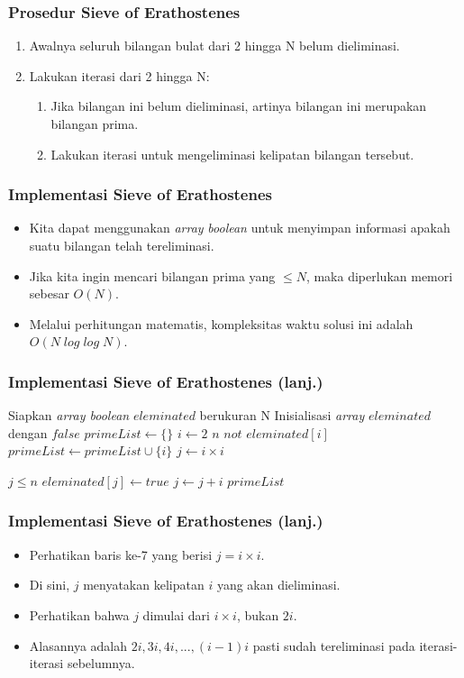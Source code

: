 \begin{frame}
\frametitle{Prosedur Sieve of Erathostenes}
\begin{enumerate}
  \item Awalnya seluruh bilangan bulat dari 2 hingga N belum dieliminasi.
  \item Lakukan iterasi dari 2 hingga N:
  \begin{enumerate}
    \item Jika bilangan ini belum dieliminasi, artinya bilangan ini merupakan bilangan prima.
    \item Lakukan iterasi untuk mengeliminasi kelipatan bilangan tersebut.  
  \end{enumerate}
\end{enumerate}
\end{frame}

\begin{frame}
\frametitle{Implementasi Sieve of Erathostenes}
\begin{itemize}
  \item Kita dapat menggunakan \textit{array} \textit{boolean} untuk menyimpan informasi apakah suatu bilangan telah tereliminasi.
  \item Jika kita ingin mencari bilangan prima yang $\leq N$, maka diperlukan memori sebesar $O(N)$.
  \item Melalui perhitungan matematis, kompleksitas waktu solusi ini adalah $O(N\;log\;log\;N)$.
\end{itemize}
\end{frame}

\begin{frame}[fragile]
\frametitle{Implementasi Sieve of Erathostenes (lanj.)}
\begin{codebox}
\li \Comment Siapkan \textit{array boolean} $eleminated$ berukuran N
\li \Comment Inisialisasi \textit{array} $eleminated$ dengan $false$
\li $primeList \gets \{\}$
\li \For $i \gets 2$ \To $n$
    \Do
\li   \If $not$ $eleminated[i]$
      \Then
\li     $primeList \gets primeList \cup \{i\}$
\li     $j \gets i \times i$ 

\li     \While $j \leq n$
        \Do
\li       $eleminated[j] \gets true$
\li       $j \gets j + i$       
        \End
      \End      
    \End
\li \Return $primeList$
\end{codebox}
\end{frame}

\begin{frame}
\frametitle{Implementasi Sieve of Erathostenes (lanj.)}
\begin{itemize}
  \item Perhatikan baris ke-7 yang berisi $j = i \times i$.
  \item Di sini, $j$ menyatakan kelipatan $i$ yang akan dieliminasi.
  \item Perhatikan bahwa $j$ dimulai dari $i \times i$, bukan $2i$.
  \item Alasannya adalah $2i, 3i, 4i, ..., (i-1)i$ pasti sudah tereliminasi pada iterasi-iterasi sebelumnya.
\end{itemize}
\end{frame}

